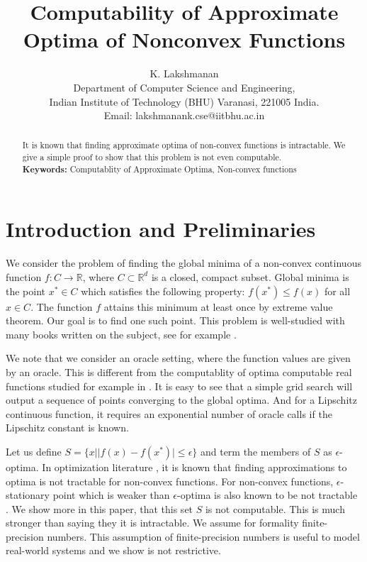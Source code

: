 \documentclass[a4paper,11pt]{article}
\theoremstyle{definition}
\theoremstyle{remark}
\begin{document}
	\title{Computability of Approximate Optima of Nonconvex Functions}
	\author{K. Lakshmanan \\ Department of Computer Science and Engineering, \\ Indian Institute of Technology (BHU) Varanasi, 221005 India. \\ Email: lakshmanank.cse@iitbhu.ac.in}
	\date{}

	\maketitle
		
	\begin{abstract}
		It is known that finding approximate optima of non-convex functions is intractable. We give a simple proof to show that this problem is not even computable. \\ 
		\textbf{Keywords:}	Computablity of Approximate Optima, Non-convex functions
	\end{abstract}
	
	\section{Introduction and Preliminaries}
	We consider the problem of finding the global minima of a non-convex continuous function $f:  C \rightarrow \mathbb{R}$, where $ C \subset \mathbb{R}^d$ is a closed, compact subset. Global minima is the point $x^* \in C$ which satisfies the following property: $f(x^*) \leq f(x)$ for all $x \in C$. The function $f$ attains this minimum at least once by extreme value theorem. Our goal is to find one such point. This problem is well-studied with many books written on the subject, see for example \cite{globook}.

	We note that we consider an oracle setting, where the function values are given by an oracle. This is different from the computablity of optima computable real functions studied for example in \cite{pour}. It is easy to see that a simple grid search will output a sequence of points converging to the global optima. And for a Lipschitz continuous function, it requires an exponential number of oracle calls \cite{nest} if the Lipschitz constant is known. %
	
	Let us define $S = \{x||f(x)-f(x^*)|\leq \epsilon\}$ and term the members of $S$ as $\epsilon$-optima. In optimization literature \cite{foster2019complexity,zhang2020complexity}, it is known that finding approximations to optima is not tractable for non-convex functions. For non-convex functions, $\epsilon$-stationary point which is weaker than $\epsilon$-optima is also known to be not tractable \cite{zhang2020complexity}. We show more in this paper, that this set $S$ is not computable. This is much stronger than saying they it is intractable. We assume for formality finite-precision numbers. This assumption of finite-precision numbers is useful to model real-world systems and we show is not restrictive.
	
\end{document}
